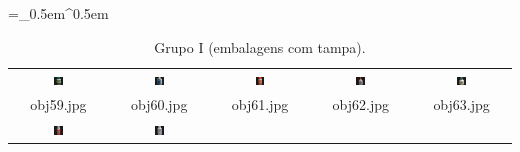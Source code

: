 \begin{table}[H]
  \centering
  \caption{Grupo I (embalagens com tampa).}
  \tabulinesep =_0.5em^0.5em
  \everyrow{\tabucline[0.4pt]-}
  \begin{tabu}{|ccccc|}
    \includegraphics[width=0.1\textwidth,height=0.1\textwidth]{imagens/coil_100/embalagens_tampas/obj5__0.png} &
    \includegraphics[width=0.1\textwidth,height=0.1\textwidth]{imagens/coil_100/embalagens_tampas/obj13__40.png} &
    \includegraphics[width=0.1\textwidth,height=0.1\textwidth]{imagens/coil_100/embalagens_tampas/obj24__0.png} &
    \includegraphics[width=0.1\textwidth,height=0.1\textwidth]{imagens/coil_100/embalagens_tampas/obj33__0.png} &
    \includegraphics[width=0.1\textwidth,height=0.1\textwidth]{imagens/coil_100/embalagens_tampas/obj50__0.png}
    \\
    \scriptsize{obj59.jpg} & \scriptsize{obj60.jpg} & \scriptsize{obj61.jpg} &
    \scriptsize{obj62.jpg} & \scriptsize{obj63.jpg}
    \\
    \includegraphics[width=0.1\textwidth,height=0.1\textwidth]{imagens/coil_100/embalagens_tampas/obj61__0.png} &
    \includegraphics[width=0.1\textwidth,height=0.1\textwidth]{imagens/coil_100/embalagens_tampas/obj64__0.png} &

\end{tabu}
\end{table}
